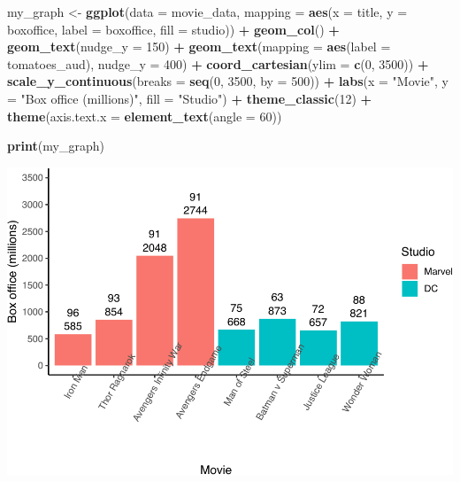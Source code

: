 \documentclass[
]{krantz}
\makeatletter
\newenvironment{Shaded}{\begin{snugshade}}{\end{snugshade}}
\newcommand{\DataTypeTok}[1]{\textcolor[rgb]{0.27,0.27,0.27}{#1}}
\newcommand{\DecValTok}[1]{\textcolor[rgb]{0.06,0.06,0.06}{#1}}
\newcommand{\KeywordTok}[1]{\textcolor[rgb]{0.27,0.27,0.27}{\textbf{#1}}}
\newcommand{\NormalTok}[1]{#1}
\newcommand{\OperatorTok}[1]{\textcolor[rgb]{0.43,0.43,0.43}{\textbf{#1}}}
\newcommand{\StringTok}[1]{\textcolor[rgb]{0.5,0.5,0.5}{#1}}
\newenvironment{kframe}{%
\medskip{}
\setlength{\fboxsep}{.8em}
 \def\at@end@of@kframe{}%
 \ifinner\ifhmode%
  \def\at@end@of@kframe{\end{minipage}}%
  \begin{minipage}{\columnwidth}%
 \fi\fi%
 \def\FrameCommand##1{\hskip\@totalleftmargin \hskip-\fboxsep
 \colorbox{shadecolor}{##1}\hskip-\fboxsep
     \hskip-\linewidth \hskip-\@totalleftmargin \hskip\columnwidth}%
 \MakeFramed {\advance\hsize-\width
   \@totalleftmargin\z@ \linewidth\hsize
   \@setminipage}}%
 {\par\unskip\endMakeFramed%
 \at@end@of@kframe}
\renewenvironment{Shaded}{\begin{kframe}}{\end{kframe}}
\makeatother
\begin{document}
\begin{Shaded}
\begin{Highlighting}[]
\NormalTok{my_graph <-}\StringTok{ }\KeywordTok{ggplot}\NormalTok{(}\DataTypeTok{data =}\NormalTok{ movie_data,}
           \DataTypeTok{mapping =} \KeywordTok{aes}\NormalTok{(}\DataTypeTok{x =}\NormalTok{ title,}
                         \DataTypeTok{y =}\NormalTok{ boxoffice,}
                         \DataTypeTok{label =}\NormalTok{ boxoffice, }
                         \DataTypeTok{fill =}\NormalTok{ studio)) }\OperatorTok{+}
\StringTok{  }\KeywordTok{geom_col}\NormalTok{() }\OperatorTok{+}
\StringTok{  }\KeywordTok{geom_text}\NormalTok{(}\DataTypeTok{nudge_y =} \DecValTok{150}\NormalTok{)  }\OperatorTok{+}
\StringTok{  }\KeywordTok{geom_text}\NormalTok{(}\DataTypeTok{mapping =} \KeywordTok{aes}\NormalTok{(}\DataTypeTok{label =}\NormalTok{ tomatoes_aud), }
            \DataTypeTok{nudge_y =} \DecValTok{400}\NormalTok{) }\OperatorTok{+}
\StringTok{  }\KeywordTok{coord_cartesian}\NormalTok{(}\DataTypeTok{ylim =} \KeywordTok{c}\NormalTok{(}\DecValTok{0}\NormalTok{, }\DecValTok{3500}\NormalTok{)) }\OperatorTok{+}
\StringTok{  }\KeywordTok{scale_y_continuous}\NormalTok{(}\DataTypeTok{breaks =} \KeywordTok{seq}\NormalTok{(}\DecValTok{0}\NormalTok{, }\DecValTok{3500}\NormalTok{, }\DataTypeTok{by =} \DecValTok{500}\NormalTok{)) }\OperatorTok{+}
\StringTok{  }\KeywordTok{labs}\NormalTok{(}\DataTypeTok{x =} \StringTok{"Movie"}\NormalTok{,}
       \DataTypeTok{y =} \StringTok{"Box office (millions)"}\NormalTok{,}
       \DataTypeTok{fill =} \StringTok{"Studio"}\NormalTok{) }\OperatorTok{+}
\StringTok{  }\KeywordTok{theme_classic}\NormalTok{(}\DecValTok{12}\NormalTok{) }\OperatorTok{+}
\StringTok{  }\KeywordTok{theme}\NormalTok{(}\DataTypeTok{axis.text.x =} \KeywordTok{element_text}\NormalTok{(}\DataTypeTok{angle =} \DecValTok{60}\NormalTok{))}

\KeywordTok{print}\NormalTok{(my_graph)}
\end{Highlighting}
\end{Shaded}

\includegraphics[width=0.65\linewidth]{bookdown_files/figure-latex/unnamed-chunk-277-1}
\end{document}
